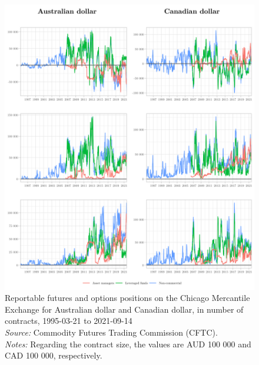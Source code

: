 \documentclass[a4paper, twoside]{templates/ociamthesis}
\begin{document}
\begin{figure}[!ht]

{\centering \includegraphics[width=0.99\columnwidth]{figure/GTOG_AUDCAD} 

}

\caption[Reportable futures and options positions on the Chicago Mercantile Exchange for Australian dollar and Canadian dollar, in number of contracts, 1995-03-21 to 2021-09-14]{Reportable futures and options positions on the Chicago Mercantile Exchange for Australian dollar and Canadian dollar, in number of contracts, 1995-03-21 to 2021-09-14 \\ \scriptsize \textit{Source:} Commodity Futures Trading Commission (CFTC). \\ \scriptsize \textit{Notes:} Regarding the contract size, the values are AUD 100 000 and CAD 100 000, respectively.}\label{fig:FigureA31}
\end{figure}

\clearpage
\end{document}
